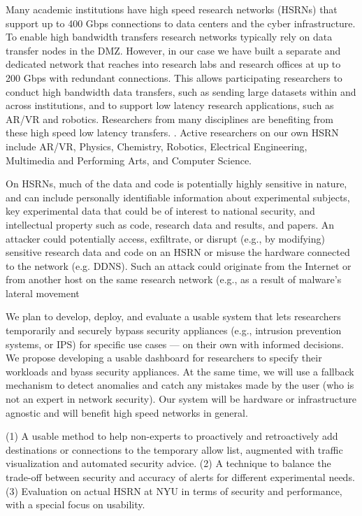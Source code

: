 \begin{center}
{\large \bf \TITLE}
\end{center}


Many academic institutions have high speed research networks (HSRNs) that support up to 400 Gbps connections to data centers and the cyber infrastructure. To enable high bandwidth transfers research networks typically rely on data transfer nodes in the DMZ. However, in our case we have built a separate and dedicated network that reaches into research labs and research offices at up to 200 Gbps with redundant connections. This allows participating researchers to conduct high bandwidth data transfers, such as sending large datasets within and across institutions, and to support  low latency research applications, such as AR/VR and robotics. Researchers from many disciplines are benefiting from these high speed low latency transfers. . Active researchers on our own HSRN include AR/VR, Physics, Chemistry, Robotics, Electrical Engineering, Multimedia and Performing Arts, and Computer Science.

On HSRNs, much of the data and code is potentially highly sensitive in nature, and can include personally identifiable information about experimental subjects, key experimental data that could be of interest to national security, and intellectual property such as code, research data and results, and papers.
An attacker could potentially access, exfiltrate, or disrupt (e.g., by modifying) sensitive research data and code on an HSRN or misuse the hardware connected to the network (e.g. DDNS). Such an  attack could originate from the Internet or from another host on the same research network (e.g., as a result of malware's lateral movement

We plan to develop, deploy, and evaluate a usable system that lets researchers temporarily and securely bypass security appliances (e.g., intrusion prevention systems, or IPS) for specific use cases — on their own with informed decisions. We propose developing a usable dashboard for researchers to specify their workloads and byass security appliances. At the same time, we will use a fallback mechanism to detect anomalies and catch any mistakes made by the user (who is not an expert in network security). Our system will be hardware or infrastructure agnostic and will benefit high speed networks in general.


(1) A usable method to help non-experts to proactively and retroactively add destinations or connections to the temporary allow list, augmented with traffic visualization and automated security advice. (2) A technique to balance the trade-off between security and accuracy of alerts  for different experimental needs. (3) Evaluation on actual HSRN at NYU in terms of security and performance, with a special focus on usability.

